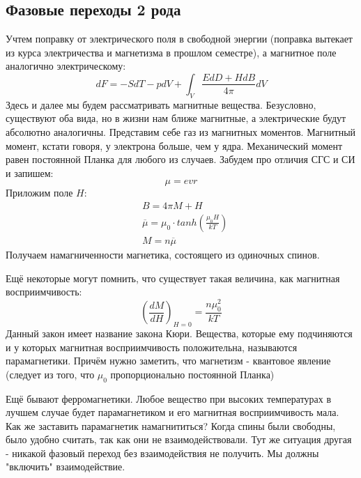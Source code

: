 \documentclass[a4paper, 12pt]{article}
\begin{document}
	\subsection{Фазовые переходы 2 рода}
	Учтем поправку от электрического поля в свободной энергии (поправка вытекает из курса электричества и магнетизма в прошлом семестре), а магнитное поле аналогично электрическому:
	\begin{equation*}
		dF = -SdT - pdV + \int_{V}  \frac{EdD+HdB}{4 \pi} dV
	\end{equation*}
	Здесь и далее мы будем рассматривать магнитные вещества. Безусловно, существуют оба вида, но в жизни нам ближе магнитные, а электрические будут абсолютно аналогичны. Представим себе газ из магнитных моментов. Магнитный момент, кстати говоря, у электрона больше, чем у ядра. Механический момент равен постоянной Планка для любого из случаев. Забудем про отличия СГС и СИ и запишем:
	\begin{equation*}
		\mu = evr
	\end{equation*}
	Приложим поле $H$:
	\begin{equation*}
		\begin{aligned}
			& B = 4 \pi M + H                                         \\
			& \overline{\mu} = \mu_0 \cdot tanh(\frac{\mu_{0} H}{kT}) \\
			& M = n \overline{\mu}                                    
		\end{aligned}
	\end{equation*}
	Получаем намагниченности магнетика, состоящего из одиночных спинов.
	
	Ещё некоторые могут помнить, что существует такая величина, как магнитная восприимчивость:
	\begin{equation*}
		(\frac{dM}{dH} )_{H=0}= \frac{n \mu_{0}^{2}} {kT}
	\end{equation*}
	Данный закон имеет название закона Кюри. Вещества, которые ему подчиняются и у которых магнитная восприимчивость положительна, называются парамагнетики. Причём нужно заметить, что магнетизм - квантовое явление (следует из того, что $\mu_{0}$ пропорционально постоянной Планка)
	
	Ещё бывают ферромагнетики. Любое вещество при высоких температурах в лучшем случае будет парамагнетиком и его магнитная восприимчивость мала. Как же заставить парамагнетик намагнититься? Когда спины были свободны, было удобно считать, так как они не взаимодействовали. Тут же ситуация другая - никакой фазовый переход без взаимодействия не получить. Мы должны "включить" взаимодействие. 
\end{document}
